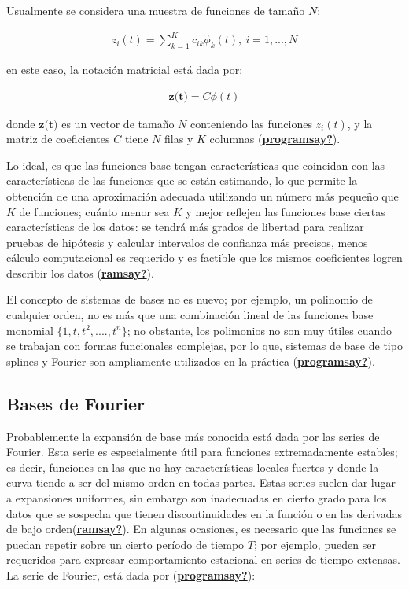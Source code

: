 \documentclass[
]{book}
\begin{document}
Usualmente se considera una muestra de funciones de tamaño \(N\):

\begin{align}
    z_i(t)=\sum_{k=1}^Kc_{ik}\phi_k(t), \ i=1,...,N
\end{align}

en este caso, la notación matricial está dada por:

\begin{align}
    \textbf{z(t)}=C\phi(t)
\end{align}

donde \(\textbf{z(t)}\) es un vector de tamaño \(N\) conteniendo las funciones \(z_i(t)\), y la matriz de coeficientes \(C\) tiene \(N\) filas y \(K\) columnas (\protect\hyperlink{ref-programsay}{\textbf{programsay?}}).

Lo ideal, es que las funciones base tengan características que coincidan con las características de las funciones que se están estimando, lo que permite la obtención de una aproximación adecuada utilizando un número más pequeño que \(K\) de funciones; cuánto menor sea \(K\) y mejor reflejen las funciones base ciertas características de los datos: se tendrá más grados de libertad para realizar pruebas de hipótesis y calcular intervalos de confianza más precisos, menos cálculo computacional es requerido y es factible que los mismos coeficientes logren describir los datos (\protect\hyperlink{ref-ramsay}{\textbf{ramsay?}}).

El concepto de sistemas de bases no es nuevo; por ejemplo, un polinomio de cualquier orden, no es más que una combinación lineal de las funciones base monomial \(\{1,t,t^2,....,t^n\}\); no obstante, los polimonios no son muy útiles cuando se trabajan con formas funcionales complejas, por lo que, sistemas de base de tipo splines y Fourier son ampliamente utilizados en la práctica (\protect\hyperlink{ref-programsay}{\textbf{programsay?}}).

\hypertarget{bases-de-fourier}{%
\subsection*{Bases de Fourier}\label{bases-de-fourier}}

Probablemente la expansión de base más conocida está dada por las series de Fourier. Esta serie es especialmente útil para funciones extremadamente estables; es decir, funciones en las que no hay características locales fuertes y donde la curva tiende a ser del mismo orden en todas partes. Estas series suelen dar lugar a expansiones uniformes, sin embargo son inadecuadas en cierto grado para los datos que se sospecha que tienen discontinuidades en la función o en las derivadas de bajo orden(\protect\hyperlink{ref-ramsay}{\textbf{ramsay?}}). En algunas ocasiones, es necesario que las funciones se puedan repetir sobre un cierto período de tiempo \(T\); por ejemplo, pueden ser requeridos para expresar comportamiento estacional en series de tiempo extensas. La serie de Fourier, está dada por (\protect\hyperlink{ref-programsay}{\textbf{programsay?}}):
\end{document}
